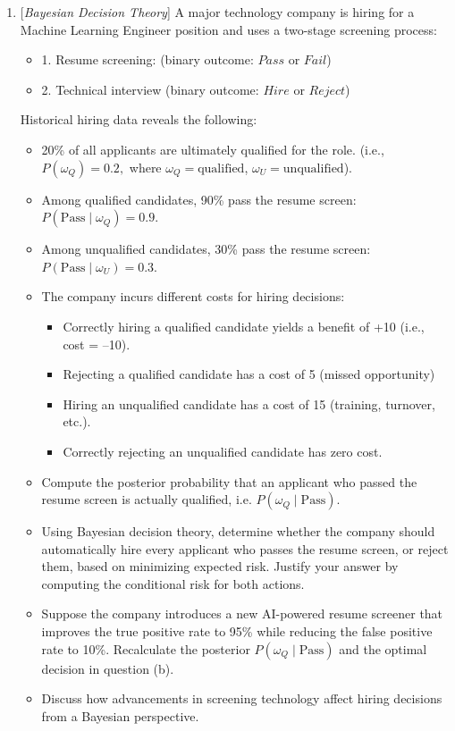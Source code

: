 \documentclass[10pt]{article}
\begin{document}
\begin{enumerate}
\item {} {[}\textit{Bayesian Decision Theory}{]} A major technology
company is hiring for a Machine Learning Engineer position and uses
a two-stage screening process: 
\begin{itemize}
\item 1. Resume screening: (binary outcome: $\textit{Pass}$ or $\textit{Fail}$)
\item 2. Technical interview (binary outcome: $\textit{Hire}$ or $\textit{Reject}$)
\end{itemize}
Historical hiring data reveals the following:
\begin{itemize}
\item 20\% of all applicants are ultimately qualified for the role. (i.e.,
$P\left(\omega_{Q}\right)=0.2,$ where $\omega_{Q}=\mathrm{qualified}$,
$\omega_{U}=\mathrm{unqualified}$).
\item Among qualified candidates, 90\% pass the resume screen: $P\left(\mathrm{Pass}\mid\omega_{Q}\right)=0.9$.
\item Among unqualified candidates, 30\% pass the resume screen: $P\left(\mathrm{Pass}\mid\omega_{U}\right)=0.3$.
\item The company incurs different costs for hiring decisions:
\begin{itemize}
\item Correctly hiring a qualified candidate yields a benefit of +10 (i.e.,
cost = --10).
\item Rejecting a qualified candidate has a cost of 5 (missed opportunity)
\item Hiring an unqualified candidate has a cost of 15 (training, turnover,
etc.).
\item Correctly rejecting an unqualified candidate has zero cost.
\end{itemize}
\item[(a)]  Compute the posterior probability that an applicant who passed the
resume screen is actually qualified, i.e. $P\left(\omega_{Q}\mid\mathrm{Pass}\right)$.
\item[(b)]  Using Bayesian decision theory, determine whether the company should
automatically hire every applicant who passes the resume screen, or
reject them, based on minimizing expected risk. Justify your answer
by computing the conditional risk for both actions.
\item[(c)]  Suppose the company introduces a new AI-powered resume screener
that improves the true positive rate to 95\% while reducing the false
positive rate to 10\%. Recalculate the posterior $P\left(\omega_{Q}\mid\mathrm{Pass}\right)$
and the optimal decision in question (b).
\item[(d)] Discuss how advancements in screening technology affect hiring decisions
from a Bayesian perspective.
\end{itemize}


\end{enumerate}
\end{document}
